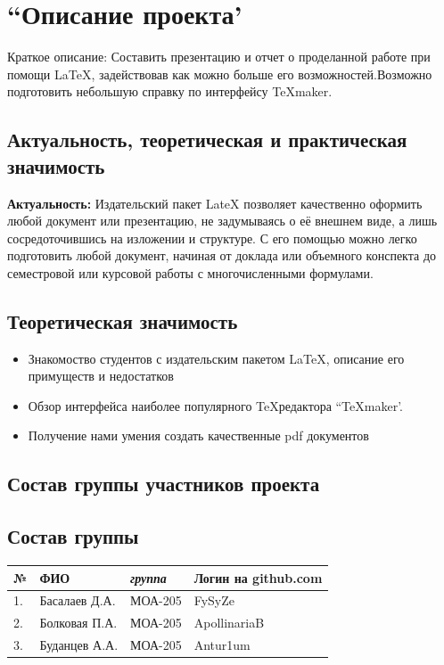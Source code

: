 \documentclass[a4paper,12pt]{report}
\begin{document}
\newpage%
\tableofcontents


\newpage%
\section{``Описание проекта'}
Краткое описание: Составить презентацию и отчет о проделанной работе при помощи \LaTeX, задействовав как можно больше его возможностей.Возможно подготовить небольшую справку по интерфейсу \TeX maker.
\subsection{Актуальность, теоретическая и практическая значимость}
\textbf{Актуальность:}
Издательский пакет LateX позволяет качественно оформить любой документ или презентацию, не задумываясь о её внешнем виде, а лишь сосредоточившись на изложении и структуре. С его помощью можно легко подготовить любой документ, начиная от доклада или объемного конспекта до семестровой или курсовой работы с многочисленными формулами.
\subsection{Теоретическая значимость}
\begin{itemize}
  \item Знакомоство студентов с издательским пакетом \LaTeX, описание его примуществ и недостатков
  \item Обзор интерфейса наиболее популярного \TeX редактора ``\TeX maker'.
 \item Получение нами умения создать качественные pdf документов 
\end{itemize} 
\subsection{Состав группы участников проекта}
\subsection{Состав группы}
\begin{tabular}{| l| l| l| l|}
\hline {\bfseries \large №} & {\bfseries \large ФИО} & {\bfseries \large \textsl{группа}} & {\bfseries \large Логин на github.com } \\ \hline
1. & Басалаев Д.А.  & МОА-205 & FySyZe \\ \hline
2. & Болковая П.А.  & МОА-205 & ApollinariaB \\ \hline
3. & Буданцев А.А.  & МОА-205 & Antur1um \\ \hline
\end{tabular}
\end{document}
